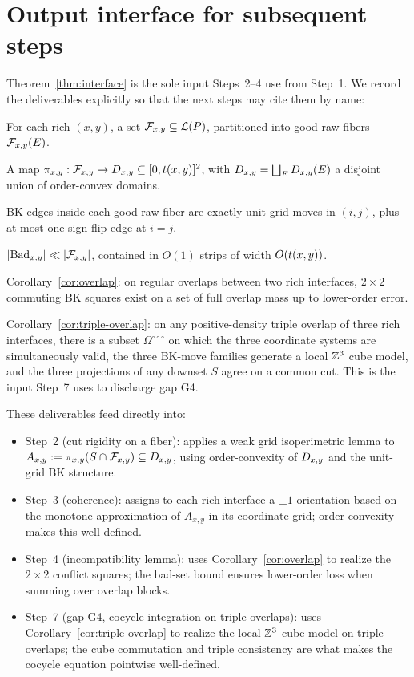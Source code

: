 \section{Output interface for subsequent steps}

Theorem~\ref{thm:interface} is the sole input Steps~2--4 use from Step~1.
We record the deliverables explicitly so that the next steps may cite them
by name:

\begin{description}[style=nextline]
\item[Fiber.] For each rich $(x,y)$, a set $\mathcal{F}_{x,y}\subseteq\mathcal{L}(P)$, partitioned
into good raw fibers $\mathcal{F}_{x,y}(E)$.
\item[Coordinates.] A map $\pi_{x,y}:\mathcal{F}_{x,y}\to D_{x,y}\subseteq[0,t(x,y)]^2$, with
$D_{x,y}=\bigsqcup_ED_{x,y}(E)$ a disjoint union of order-convex domains.
\item[Grid structure.] BK edges inside each good raw fiber are exactly
unit grid moves in $(i,j)$, plus at most one sign-flip edge at $i=j$.
\item[Bad set bound.] $|\mathrm{Bad}_{x,y}|\ll |\mathcal{F}_{x,y}|$, contained in
$O(1)$ strips of width $O(t(x,y))$.
\item[Overlap structure.] Corollary~\ref{cor:overlap}: on regular overlaps
between two rich interfaces, $2\times 2$ commuting BK squares exist on a
set of full overlap mass up to lower-order error.
\item[Triple-overlap cube.] Corollary~\ref{cor:triple-overlap}: on any
positive-density triple overlap of three rich interfaces, there is a
subset $\Omega^{\circ\circ\circ}$ on which the three coordinate systems
are simultaneously valid, the three BK-move families generate a local
$\mathbb{Z}^3$ cube model, and the three projections of any downset $S$ agree on
a common cut. This is the input Step~7 uses to discharge gap G4.
\end{description}

These deliverables feed directly into:
\begin{itemize}[nosep]
\item Step~2 (cut rigidity on a fiber): applies a weak grid isoperimetric
lemma to $A_{x,y}:=\pi_{x,y}(S\cap\mathcal{F}_{x,y})\subseteq D_{x,y}$, using order-convexity
of $D_{x,y}$ and the unit-grid BK structure.
\item Step~3 (coherence): assigns to each rich interface a $\pm1$
orientation based on the monotone approximation of $A_{x,y}$ in its
coordinate grid; order-convexity makes this well-defined.
\item Step~4 (incompatibility lemma): uses Corollary~\ref{cor:overlap}
to realize the $2\times 2$ conflict squares; the bad-set bound ensures
lower-order loss when summing over overlap blocks.
\item Step~7 (gap G4, cocycle integration on triple overlaps): uses
Corollary~\ref{cor:triple-overlap} to realize the local $\mathbb{Z}^3$ cube
model on triple overlaps; the cube commutation and triple consistency
are what makes the cocycle equation pointwise well-defined.
\end{itemize}

